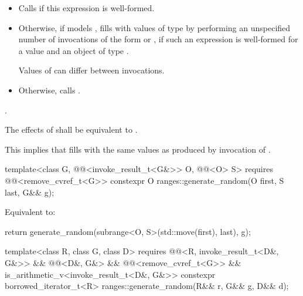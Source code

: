 \begin{itemdescr}
\pnum
\effects
\begin{itemize}
\item
Calls 
if this expression is well-formed.
\item
Otherwise, if  models ,
fills  with  values of
type  by performing
an unspecified number of invocations of
the form  or ,
if such an expression is well-formed for a value  and
an object  of type .
\begin{note}
Values of  can differ between invocations.
\end{note}
\item
Otherwise, calls .
\end{itemize}

\pnum
\returns
{}.

\pnum
\remarks
The effects of  shall be equivalent to
.
\begin{note}
This implies that  fills 
with the same values as produced by invocation of .
\end{note}
\end{itemdescr}

%
\begin{itemdecl}
template<class G, @@<invoke_result_t<G&>> O, @@<O> S>
  requires @@<remove_cvref_t<G>>
constexpr O ranges::generate_random(O first, S last, G&& g);
\end{itemdecl}

\begin{itemdescr}
\pnum
\effects
Equivalent to:
\begin{codeblock}
return generate_random(subrange<O, S>(std::move(first), last), g);
\end{codeblock}
\end{itemdescr}

%
\begin{itemdecl}
template<class R, class G, class D>
  requires @@<R, invoke_result_t<D&, G&>> && @@<D&, G&> &&
           @@<remove_cvref_t<G>> &&
           is_arithmetic_v<invoke_result_t<D&, G&>>
constexpr borrowed_iterator_t<R> ranges::generate_random(R&& r, G&& g, D&& d);
\end{itemdecl}

